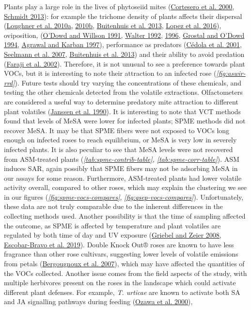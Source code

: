 \documentclass{ufdissertation}[overrideChapters] %
\begin{document}
{Plants play a large role in the lives of phytoseiid mites (\protect\hyperlink{ref-Cortesero2000}{Cortesero et al. 2000}, \protect\hyperlink{ref-Schmidt2013}{Schmidt 2013}): for example the trichome density of plants affects their dispersal (\protect\hyperlink{ref-Loughner2010}{Loughner et al. 2010a}, \protect\hyperlink{ref-Loughner2010a}{2010b}, \protect\hyperlink{ref-Buitenhuis2013}{Buitenhuis et al. 2013}, \protect\hyperlink{ref-Lopez2016}{Lopez et al. 2016}), oviposition, (\protect\hyperlink{ref-ODowd1991}{O'Dowd and Willson 1991}, \protect\hyperlink{ref-Walter1992}{Walter 1992}, \protect\hyperlink{ref-Walter1996}{1996}, \protect\hyperlink{ref-Grostal1994}{Grostal and O'Dowd 1994}, \protect\hyperlink{ref-Agrawal1997}{Agrawal and Karban 1997}), performance as predators (\protect\hyperlink{ref-Cedola2001}{Cédola et al. 2001}, \protect\hyperlink{ref-Seelmann2007}{Seelmann et al. 2007}, \protect\hyperlink{ref-Buitenhuis2013}{Buitenhuis et al. 2013}) and their ability to avoid predation (\protect\hyperlink{ref-Faraji2002}{Faraji et al. 2002}). Therefore, it is not unusual to see a preference towards plant VOCs, but it is interesting to note their attraction to an infected rose (\emph{\ref{fig:aswir-rrd}}). Future tests should try varying the concentrations of these chemicals, and testing the other chemicals detected from the volatile extractions. Olfactometers are considered a useful way to determine predatory mite attraction to different plant volatiles (\protect\hyperlink{ref-Janssen1990}{Janssen et al. 1990}). It is interesting to note that VCT methods found that levels of MeSA were lower for infected plants; SPME methods did not recover MeSA. It may be that SPME fibers were not exposed to VOCs long enough on infected roses to reach equilibrium, or MeSA is very low in severely infected plants. It is also peculiar to see that MeSA levels were not recovered from ASM-treated plants (\emph{\ref{tab:spme-contrib-table}, \ref{tab:spme-corr-table}}). ASM induces SAR, again possibly that SPME fibers may not be adsorbing MeSA in our assays for some reason. Furthermore, ASM-treated plants had lower volatile activity overall, compared to other roses, which may explain the clustering we see in our figures (\emph{\ref{fig:spme-vocs-compares}}, \emph{\ref{fig:qsep-vocs-compares}}). Unfortunately, these data are not truly comparable due to the inherent differences in the collecting methods used. Another possibility is that the time of sampling affected the outcome, as SPME is affected by temperature and plant volatiles are regulated by both time of day and UV exposure (\protect\hyperlink{ref-Griebel2008}{Griebel and Zeier 2008}, \protect\hyperlink{ref-EscobarBravo2019}{Escobar-Bravo et al. 2019}). Double Knock Out® roses are known to have less fragrance than other rose cultivars, suggesting lower levels of volatile emissions from petals (\protect\hyperlink{ref-Bergougnoux2007}{Bergougnoux et al. 2007}), which may have affected the quantities of the VOCs collected. Another issue comes from the field aspects of the study, with multiple herbivores present on the roses in the landscape which could activate different plant defenses. For example, \emph{T. urticae} are known to activate both SA and JA signalling pathways during feeding (\protect\hyperlink{ref-Ozawa2000}{Ozawa et al. 2000}), }
\end{document}
